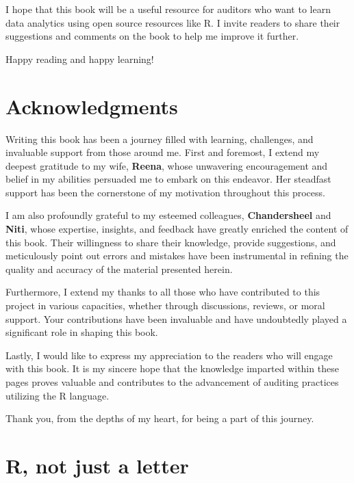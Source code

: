 \documentclass[
]{book}
\begin{document}
I hope that this book will be a useful resource for auditors who want to learn data analytics using open source resources like R. I invite readers to share their suggestions and comments on the book to help me improve it further.

Happy reading and happy learning!

\hypertarget{acknowledgments}{%
\section*{Acknowledgments}\label{acknowledgments}}

Writing this book has been a journey filled with learning, challenges, and invaluable support from those around me. First and foremost, I extend my deepest gratitude to my wife, \textbf{Reena}, whose unwavering encouragement and belief in my abilities persuaded me to embark on this endeavor. Her steadfast support has been the cornerstone of my motivation throughout this process.

I am also profoundly grateful to my esteemed colleagues, \textbf{Chandersheel} and \textbf{Niti}, whose expertise, insights, and feedback have greatly enriched the content of this book. Their willingness to share their knowledge, provide suggestions, and meticulously point out errors and mistakes have been instrumental in refining the quality and accuracy of the material presented herein.

Furthermore, I extend my thanks to all those who have contributed to this project in various capacities, whether through discussions, reviews, or moral support. Your contributions have been invaluable and have undoubtedly played a significant role in shaping this book.

Lastly, I would like to express my appreciation to the readers who will engage with this book. It is my sincere hope that the knowledge imparted within these pages proves valuable and contributes to the advancement of auditing practices utilizing the R language.

Thank you, from the depths of my heart, for being a part of this journey.

\hypertarget{r-not-just-a-letter}{%
\section*{R, not just a letter}\label{r-not-just-a-letter}}
\end{document}
